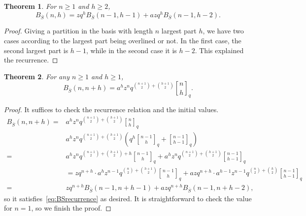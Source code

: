 \documentclass[12pt]{amsart}
\newtheorem{theorem}{Theorem}[section]
\theoremstyle{definition}
\theoremstyle{remark}
\numberwithin{equation}{section}
\begin{document}
\begin{theorem}
For $n\geq1$ and $h\geq2$,
\begin{equation}
B_{\overline{S}}(n,h)=zq^{h}B_{\overline{S}}(n-1,h-1)+azq^{h}B_{\overline{S}}(n-1,h-2).
\end{equation}
\end{theorem}
\begin{proof}
Giving a partition in the basis with length $n$ largest part $h$, we have two cases according to the largest part being overlined or not. In the first case, the second largest part is $h-1$, while in the second case it is $h-2$. This explained the recurrence.
\end{proof}
\begin{theorem}
For any $n\geq1$ and $h\geq1$,
\begin{equation}\label{eq:BSrecurrence}
B_{\overline{S}}(n,n+h)=a^{h}z^nq^{\binom{n+1}{2}+\binom{h+1}{2}}{n\brack h}_{q}.
\end{equation}
\end{theorem}
\begin{proof}
It suffices to check the recurrence relation and the initial values.
\begin{align*}
B_{\overline{S}}(n,n+h)=&a^{h}z^{n}q^{\binom{n+1}{2}+\binom{h+1}{2}}{n\brack h}_{q}\\
&a^{h}z^{n}q^{\binom{n+1}{2}+\binom{h+1}{2}}\left(q^h{n-1\brack h}_{q}+{n-1\brack h-1}_{q}\right)\\
=&a^{h}z^{n}q^{\binom{n+1}{2}+\binom{h+1}{2}+h}{n-1\brack h}_{q}+a^{h}z^{n}q^{\binom{n+1}{2}+\binom{h+1}{2}}{n-1\brack h-1}_{q}\\
&=zq^{n+h}\cdot a^{h}z^{n-1}q^{\binom{n}{2}+\binom{h+1}{2}}{n-1\brack h}_{q}+azq^{n+h}\cdot a^{h-1}z^{n-1}q^{\binom{n}{2}+\binom{h}{2}}{n-1\brack h-1}_{q}\\
=&zq^{n+h}B_{\overline{S}}(n-1,n+h-1)+azq^{n+h}B_{\overline{S}}(n-1,n+h-2),
\end{align*}
so it satisfies~\eqref{eq:BSrecurrence} as desired. It is straightforward to check the value for $n=1$, so we finish the proof.
\end{proof}
\end{document}
